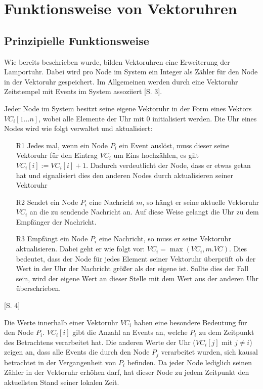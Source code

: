 \section{Funktionsweise von Vektoruhren}
\subsection{Prinzipielle Funktionsweise}

Wie bereits beschrieben wurde, bilden Vektoruhren eine Erweiterung der Lamportuhr. Dabei wird pro Node im System ein Integer als Zähler für den Node in der Vektoruhr gespeichert. Im Allgemeinen werden durch eine Vektoruhr Zeitstempel mit Events im System assoziiert \cite{Baldoni:2002:FDC:1435723.1437765}[S. 3].

Jeder Node im System besitzt seine eigene Vektoruhr in der Form eines Vektors $VC_i[1...n]$, wobei alle Elemente der Uhr mit $0$ initialisiert werden. Die Uhr eines Nodes wird wie folgt verwaltet und aktualisiert:

\begin{itemize}
	\item[R1]Jedes mal, wenn ein Node $P_i$ ein Event auslöst, muss dieser seine Vektoruhr für den Eintrag $VC_i$ um Eins hochzählen, es gilt  $VC_i[i] := VC_i[i] + 1$. Dadurch verdeutlicht der Node, dass er etwas getan hat und signalisiert dies den anderen Nodes durch aktualisieren seiner Vektoruhr 
	\item[R2]Sendet ein Node $P_i$ eine Nachricht $m$, so hängt er seine aktuelle Vektoruhr $VC_i$ an die zu sendende Nachricht an. Auf diese Weise gelangt die Uhr zu dem Empfänger der Nachricht.
	\item[R3]Empfängt ein Node $P_i$ eine Nachricht, so muss er seine Vektoruhr aktualisieren. Dabei geht er wie folgt vor: $VC_i = \max(VC_i, m.VC)$. Dies bedeutet, dass der Node für jedes Element seiner Vektoruhr überprüft ob der Wert in der Uhr der Nachricht größer als der eigene ist. Sollte dies der Fall sein, wird der eigene Wert an dieser Stelle mit dem Wert aus der anderen Uhr überschrieben.\label{R3}
\end{itemize} \cite{Baldoni:2002:FDC:1435723.1437765}[S. 4]

Die Werte innerhalb einer Vektoruhr $VC_i$ haben eine besondere Bedeutung für den Node $P_i$. $VC_i[i]$ gibt die Anzahl an Events an, welche $P_i$ zu dem Zeitpunkt des Betrachtens verarbeitet hat. Die anderen Werte der Uhr ($VC_i[j]$ mit $j \neq i$) zeigen an, dass alle Events die durch den Node $P_j$ verarbeitet wurden, sich kausal betrachtet in der Vergangenheit von $P_i$ befinden. Da jeder Node lediglich seinen Zähler in der Vektoruhr erhöhen darf, hat dieser Node zu jedem Zeitpunkt den aktuellsten Stand seiner lokalen Zeit.

